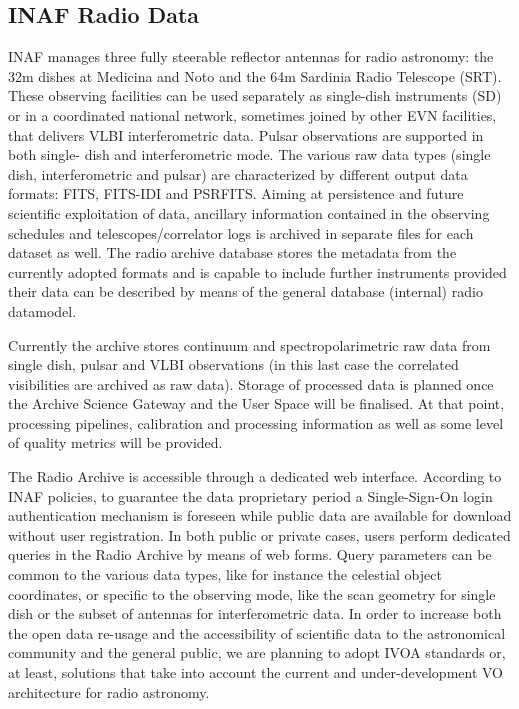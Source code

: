 \documentclass[11pt,a4paper]{ivoa}
\begin{document}
\subsection{INAF Radio Data}
\label{sec:INAF}
INAF manages three fully steerable reflector antennas for radio astronomy: the 32m dishes at Medicina 
and Noto and the 64m Sardinia Radio Telescope (SRT). These observing facilities can be used separately 
as single-dish instruments (SD) or in a coordinated national network, sometimes joined by other EVN 
facilities, that delivers VLBI interferometric data. Pulsar observations are supported in both single-
dish and interferometric mode. The various raw data types (single dish, interferometric and pulsar) are 
characterized by different output data formats: FITS, FITS-IDI and PSRFITS. Aiming at persistence and 
future scientific exploitation of data, ancillary information contained in the observing schedules and 
telescopes/correlator logs is archived in separate files for each dataset as well. The radio archive 
database stores the metadata from the currently adopted formats and is capable to include further 
instruments provided their data can be described by means of the general database (internal) radio 
datamodel.

Currently the archive stores continuum and spectropolarimetric raw data from single dish, pulsar and 
VLBI observations (in this last case the correlated visibilities are archived as raw data). Storage of 
processed data is planned once the Archive Science Gateway and the User Space will be finalised. At that 
point, processing pipelines, calibration and processing information as well as some level of quality 
metrics will be provided.

The Radio Archive is accessible through a dedicated web interface. According to INAF policies, to 
guarantee the data proprietary period a Single-Sign-On login authentication mechanism is foreseen while 
public data are available for download without user registration. In both public or private cases, users 
perform dedicated queries in the Radio Archive by means of web forms. Query parameters can be common to 
the various data types, like for instance the celestial object coordinates, or specific to the observing 
mode, like the scan geometry for single dish or the subset of antennas for interferometric data. In 
order to increase both the open data re-usage and the accessibility of scientific data to the 
astronomical community and the general public, we are planning to adopt IVOA standards or, at least, 
solutions that take into account the current and under-development VO architecture for radio astronomy.
\end{document}
